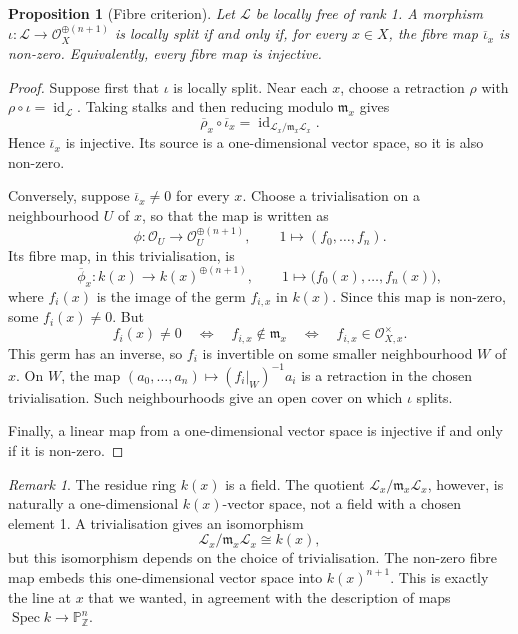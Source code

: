 \documentclass{article}
\theoremstyle{definition}
\theoremstyle{remark}
\newtheorem{remark}{Remark}[section]
\theoremstyle{plain}
\newtheorem{proposition}{Proposition}[section]
\DeclareMathOperator{\Spec}{Spec}
\newcommand{\Z}{\mathbb{Z}}
\renewcommand{\P}{\mathbb{P}}
\begin{document}
\begin{proposition}[Fibre criterion]\label{prop:lsi-fibre-criterion}
    Let \(\mathcal{L}\) be locally free of rank 1. A morphism
    \(\iota:\mathcal{L}\to\mathcal{O}_X^{\oplus(n+1)}\) is locally split
    if and only if, for every \(x\in X\), the fibre map
    \(\overline{\iota}_x\) is non-zero. Equivalently, every fibre map is
    injective.
\end{proposition}

\begin{proof}
    Suppose first that \(\iota\) is locally split. Near each \(x\), choose
    a retraction \(\rho\) with
    \(\rho\circ\iota=\operatorname{id}_{\mathcal{L}}\).
    Taking stalks and then reducing modulo \(\mathfrak{m}_x\) gives
    \[
        \overline{\rho}_x\circ\overline{\iota}_x
        =\operatorname{id}_{\mathcal{L}_x/
            \mathfrak{m}_x\mathcal{L}_x}.
    \]
    Hence \(\overline{\iota}_x\) is injective. Its source is a
    one-dimensional vector space, so it is also non-zero.

    Conversely, suppose \(\overline{\iota}_x\ne0\) for every \(x\).
    Choose a trivialisation on a neighbourhood \(U\) of \(x\), so that
    the map is written as
    \[
        \phi:\mathcal{O}_U\longrightarrow
        \mathcal{O}_U^{\oplus(n+1)},
        \qquad 1\longmapsto(f_0,\dots,f_n).
    \]
    Its fibre map, in this trivialisation, is
    \[
        \overline{\phi}_x:k(x)\longrightarrow k(x)^{\oplus(n+1)},
        \qquad 1\longmapsto\bigl(f_0(x),\dots,f_n(x)\bigr),
    \]
    where \(f_i(x)\) is the image of the germ \(f_{i,x}\) in \(k(x)\).
    Since this map is non-zero, some \(f_i(x)\ne0\). But
    \[
        f_i(x)\ne0
        \quad\Longleftrightarrow\quad
        f_{i,x}\notin\mathfrak{m}_x
        \quad\Longleftrightarrow\quad
        f_{i,x}\in\mathcal{O}_{X,x}^{\times}.
    \]
    This germ has an inverse, so \(f_i\) is invertible on some smaller
    neighbourhood \(W\) of \(x\). On \(W\), the map
    \((a_0,\dots,a_n)\mapsto(f_i|_W)^{-1}a_i\) is a retraction in the
    chosen trivialisation. Such neighbourhoods give an open cover on
    which \(\iota\) splits.

    Finally, a linear map from a one-dimensional vector space is
    injective if and only if it is non-zero.
\end{proof}

\begin{remark}\label{rem:lsi-fibre-line}
    The residue ring \(k(x)\) is a field. The quotient
    \(\mathcal{L}_x/\mathfrak{m}_x\mathcal{L}_x\), however, is naturally
    a one-dimensional \(k(x)\)-vector space, not a field with a chosen
    element 1. A trivialisation gives an isomorphism
    \[
        \mathcal{L}_x/\mathfrak{m}_x\mathcal{L}_x\cong k(x),
    \]
    but this isomorphism depends on the choice of trivialisation.
    The non-zero fibre map embeds this one-dimensional vector space
    into \(k(x)^{n+1}\). This is exactly the line at \(x\) that we wanted,
    in agreement with the description of maps
    \(\Spec k\to\P^n_\Z\).
\end{remark}
\end{document}
